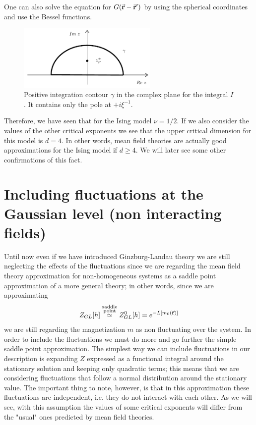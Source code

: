 \documentclass[../main/main.tex]{subfiles}
\begin{document}
One can also solve the equation for \( G(\va{r}- \va{r}') \)   by using the spherical coordinates and use the Bessel functions.

\begin{figure}[h!]
\centering
\includegraphics[width=0.6\textwidth]{../lessons/18_image/1.pdf}
\caption{\label{fig:18_1} Positive integration contour \( \gamma   \) in the complex plane for the integral \( I \). It contains only the pole at \( +i \xi ^{-1} \).}
\end{figure}


Therefore, we have seen that for the Ising model \( \nu = 1/2 \). If we also consider the values of the other critical exponents we see that the upper critical dimension for this model is \( d=4 \). In other words, mean field theories are actually good approximations for the Ising model if \( d \geq 4 \). We will later see some other confirmations of this fact.





\section{Including fluctuations at the Gaussian level (non interacting fields)}
Until now even if we have introduced Ginzburg-Landau theory we are still neglecting the effects of the fluctuations since we are regarding the mean field theory approximation for non-homogeneous systems as a saddle point approximation of a more general theory; in other words, since we are approximating
\begin{equation*}
  Z_{GL} [h] \overset{\substack{ \text{saddle} \\  \text{point} } }{\simeq } Z_{GL}^0 [h] = e^{- L [m_0 (\va{r})]}
\end{equation*}
we are still regarding the magnetization \( m \) as non fluctuating over the system. In order to include the fluctuations we must do more and go further the simple saddle point approximation. The simplest way we can include fluctuations in our description is expanding \( Z \) expressed as a functional integral around the stationary solution and keeping only quadratic terms; this means that we are considering fluctuations that follow a normal distribution around the stationary value. The important thing to note, however, is that in this approximation these fluctuations are independent, i.e. they do not interact with each other. As we will see, with this assumption the values of some critical exponents will differ from the "usual" ones predicted by mean field theories.
\end{document}
